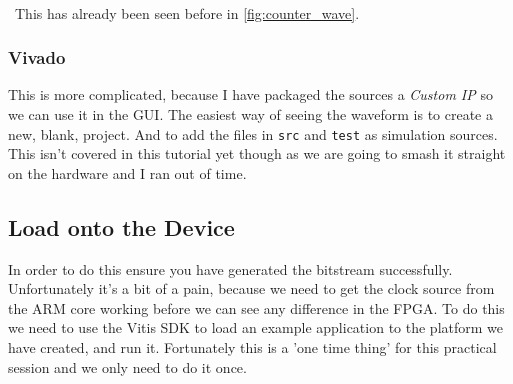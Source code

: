 

\\
\,
This has already been seen before in \cref{fig:counter_wave}.

\subsubsection{Vivado}

This is more complicated, because I have packaged the sources a \emph{Custom IP} so we can use it in the GUI. The easiest way of seeing the waveform is to create a new, blank, project. And to add the files in \texttt{src} and \texttt{test} as simulation sources. This isn't covered in this tutorial yet though as we are going to smash it straight on the hardware and I ran out of time.

\subsection{Load onto the Device}
In order to do this ensure you have generated the bitstream successfully. Unfortunately it's a bit of a pain, because we need to get the clock source from the ARM core working before we can see any difference in the FPGA. To do this we need to use the Vitis SDK to load an example application to the platform we have created, and run it. Fortunately this is a 'one time thing' for this practical session and we only need to do it once.









